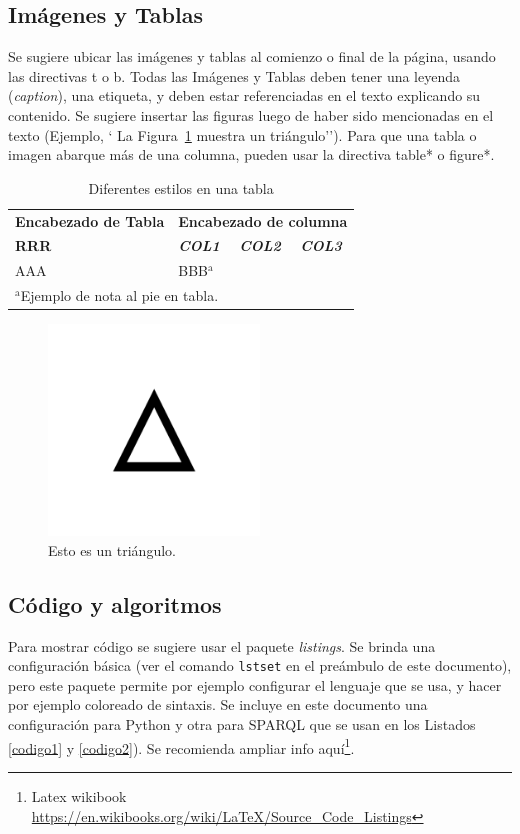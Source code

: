 \documentclass[conference]{IEEEtran}
\begin{document}
\subsection{Imágenes y Tablas} Se sugiere ubicar las imágenes y tablas al comienzo o final de la página, usando las directivas t o b. 
Todas las Imágenes y Tablas deben tener una leyenda (\textit{caption}), una etiqueta, y deben estar referenciadas en el texto explicando su contenido.
Se sugiere insertar las figuras luego de haber sido mencionadas en el texto (Ejemplo, ` La Figura~\ref{fig} muestra un triángulo'').
Para que una tabla o imagen abarque más de una columna, pueden usar la directiva table* o figure*. 

\begin{table}[b]
	\caption{Diferentes estilos en una tabla}
	\begin{center}
		\begin{tabularx}{\linewidth}{|X|X|X|X|}
			\hline
			\textbf{Encabezado de Tabla}&\multicolumn{3}{|c|}{\textbf{Encabezado de columna}} \\
			\cline{2-4} 
			\textbf{RRR} & \textbf{\textit{COL1}}& \textbf{\textit{COL2}}& \textbf{\textit{COL3}} \\
			\hline
			AAA& BBB$^{\mathrm{a}}$& &  \\
			\hline
			\multicolumn{4}{l}{$^{\mathrm{a}}$Ejemplo de nota al pie en tabla.}
		\end{tabularx}
		\label{tab1}
	\end{center}
\end{table}

\begin{figure}[t]
	\centerline{\includegraphics[width=0.5\textwidth]{imagenes/triangulo.png}}
	\caption{Esto es un triángulo.}
	\label{fig}
\end{figure}

\subsection{Código y algoritmos}
Para mostrar código se sugiere usar el paquete \textit{listings}. Se brinda una configuración básica (ver el comando \texttt{lstset} en el preámbulo de este documento), pero este paquete permite por ejemplo configurar el lenguaje que se usa, y hacer por ejemplo coloreado de sintaxis. Se incluye en este documento una configuración para Python y otra para SPARQL que se usan en los Listados \ref{codigo1} y \ref{codigo2}). Se recomienda ampliar info aquí\footnote{Latex wikibook \url{https://en.wikibooks.org/wiki/LaTeX/Source_Code_Listings}}.
\end{document}
